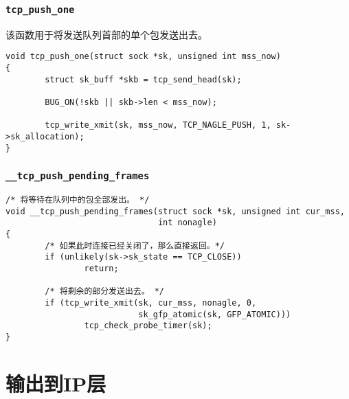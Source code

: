 \subsubsection{\texttt{tcp_push_one}}
该函数用于将发送队列首部的单个包发送出去。
\begin{verbatim}
void tcp_push_one(struct sock *sk, unsigned int mss_now)
{
        struct sk_buff *skb = tcp_send_head(sk);

        BUG_ON(!skb || skb->len < mss_now);

        tcp_write_xmit(sk, mss_now, TCP_NAGLE_PUSH, 1, sk->sk_allocation);
}
\end{verbatim}

\subsubsection{\texttt{__tcp_push_pending_frames}}
\begin{verbatim}
/* 将等待在队列中的包全部发出。 */
void __tcp_push_pending_frames(struct sock *sk, unsigned int cur_mss,
                               int nonagle)
{
        /* 如果此时连接已经关闭了，那么直接返回。*/
        if (unlikely(sk->sk_state == TCP_CLOSE))
                return;

        /* 将剩余的部分发送出去。 */
        if (tcp_write_xmit(sk, cur_mss, nonagle, 0,
                           sk_gfp_atomic(sk, GFP_ATOMIC)))
                tcp_check_probe_timer(sk);
}
\end{verbatim}

\section{输出到IP层}

